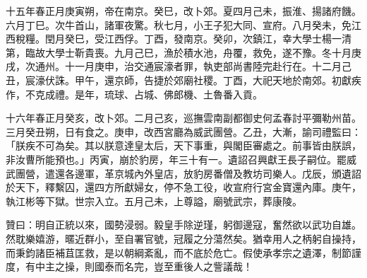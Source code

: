 \begin{pinyinscope}
十五年春正月庚寅朔，帝在南京。癸巳，改卜郊。夏四月己未，振淮、揚諸府饑。六月丁巳。次牛首山，諸軍夜驚。秋七月，小王子犯大同、宣府。八月癸未，免江西稅糧。閏月癸巳，受江西俘。丁酉，發南京。癸卯，次鎮江，幸大學士楊一清第，臨故大學士靳貴喪。九月己巳，漁於積水池，舟覆，救免，遂不豫。冬十月庚戌，次通州。十一月庚申，治交通宸濠者罪，執吏部尚書陸完赴行在。十二月己丑，宸濠伏誅。甲午，還京師，告捷於郊廟社稷。丁酉，大祀天地於南郊。初獻疾作，不克成禮。是年，琉球、占城、佛郎機、土魯番入貢。

十六年春正月癸亥，改卜郊。二月己亥，巡撫雲南副都御史何孟春討平彌勒州苗。三月癸丑朔，日有食之。庚申，改西宮廳為威武團營。乙丑，大漸，諭司禮監曰：「朕疾不可為矣。其以朕意達皇太后，天下事重，與閣臣審處之。前事皆由朕誤，非汝曹所能預也。」丙寅，崩於豹房，年三十有一。遺詔召興獻王長子嗣位。罷威武團營，遣還各邊軍，革京城內外皇店，放豹房番僧及教坊司樂人。戊辰，頒遺詔於天下，釋繫囚，還四方所獻婦女，停不急工役，收宣府行宮金寶還內庫。庚午，執江彬等下獄。世宗入立。五月己未，上尊謚，廟號武宗，葬康陵。

贊曰：明自正統以來，國勢浸弱。毅皇手除逆瑾，躬御邊寇，奮然欲以武功自雄。然耽樂嬉游，暱近群小，至自署官號，冠履之分蕩然矣。猶幸用人之柄躬自操持，而秉鈞諸臣補苴匡救，是以朝綱紊亂，而不底於危亡。假使承孝宗之遺澤，制節謹度，有中主之操，則國泰而名完，豈至重後人之訾議哉！


\end{pinyinscope}